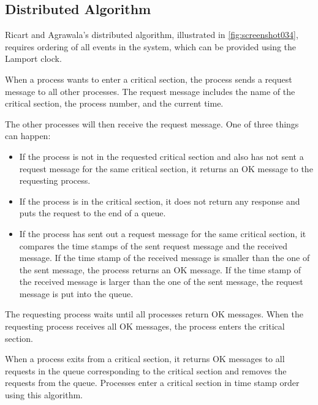 \subsection{Distributed Algorithm}
Ricart and Agrawala's distributed algorithm, illustrated in \autoref{fig:screenshot034}, requires ordering of all events in the system, which can be provided using the Lamport clock.

When a process wants to enter a critical section, the process sends a request message to all other processes. The request message includes the name of the critical section, the process number, and the current time.

The other processes will then receive the request message. One of three things can happen: \begin{itemize}
\item If the process is not in the requested critical section and also has not sent  a request message for the same critical section, it returns an OK message to the requesting process.
\item If the process is in the critical section, it does not return any response and puts the request to the end of a queue.
\item If the process has sent out a request message for the same critical section, it compares the time stamps of the sent request message and the received message. If the time stamp of the received message is smaller than the one of the sent message, the process returns an OK message. If the time stamp of the received message is larger than the one of the sent message, the request message is put into the queue.
\end{itemize}

The requesting process waits until all processes return OK messages. When the requesting process receives all OK messages, the process enters the critical section.

When a process exits from a critical section, it returns OK messages to all requests in the queue corresponding to the critical section and removes the requests from the queue. Processes enter a critical section in time stamp order using this algorithm. 

